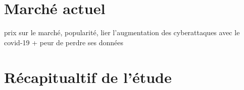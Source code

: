 \section{Marché actuel}
prix sur le marché, popularité, lier l'augmentation des cyberattaques avec le covid-19 + peur de perdre ses données
\section{Récapitualtif de l'étude}
